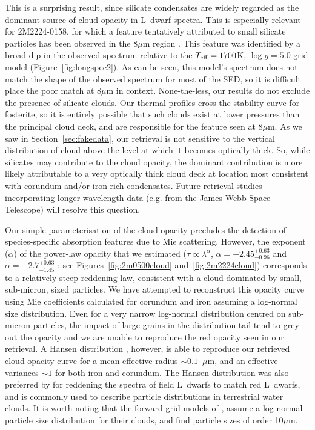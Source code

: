 \documentclass[useAMS,usenatbib]{mn2e}
\begin{document}
This is a surprising result, since silicate condensates are widely regarded as the dominant source of cloud opacity in L~dwarf spectra. 
This is especially relevant for 2M2224-0158, for which a feature tentatively attributed to small silicate particles has been observed in the 8$\mu$m region \citep{cushing2006}. This feature was identified by a broad dip in the observed spectrum relative to the $T_{\rm eff} = 1700$K, $\log g = 5.0$ grid model (Figure~\ref{fig:longspec2}).  As can be seen, this model's spectrum does not match the shape of the observed spectrum for most of the SED, so it is difficult place the poor match at 8$\mu$m in context.  None-the-less, our results do not exclude the presence of silicate clouds. Our thermal profiles cross the stability curve for fosterite, so it is entirely possible that such clouds exist at lower pressures than the principal cloud deck, and are responsible for the feature seen at 8$\mu$m. 
As we saw in Section~\ref{sec:fakedata}, our retrieval is not sensitive to the vertical distribution of cloud above the level at which it becomes optically thick. So, while silicates may contribute to the cloud opacity, the dominant contribution is more likely attributable to a very optically thick cloud deck at location most consistent with corundum and/or iron rich condensates.  Future retrieval studies incorporating longer wavelength data (e.g. from the James-Webb Space Telescope) will resolve this question. 


Our simple parameterisation of the cloud opacity precludes the detection of species-specific absorption features due to Mie scattering. However, the exponent ($\alpha$) of the power-law opacity that we estimated ($\tau \propto \lambda^\alpha$, $\alpha = -2.45^{+0.63}_{-0.96}$ and $\alpha = -2.7^{+0.63}_{-1.45}$ ; see Figures~\ref{fig:2m0500cloud} and~\ref{fig:2m2224cloud}) corresponds to a relatively steep reddening law, consistent with a cloud dominated by small, sub-micron, sized particles. We have attempted to reconstruct this opacity curve using Mie coefficients calculated for corundum and iron assuming a log-normal size distribution.  Even for a very narrow log-normal distribution centred on sub-micron particles, the impact of large grains in the distribution tail tend to grey-out the opacity and we are unable to reproduce the red opacity seen in our retrieval. A Hansen distribution \citep{hansen1971}, however, is able to reproduce our retrieved cloud opacity curve for a mean effective radius $\sim 0.1$~$\mu$m, and an effective variances $\sim 1$ for both iron and corundum.  The Hansen distribution was also preferred by \citet{hiranaka2016} for reddening the spectra of field L~dwarfs to match red L~dwarfs, and is commonly used to describe particle distributions in terrestrial water clouds.  It is worth noting that the forward grid models of \citet{sm08}, assume a log-normal particle size distribution for their clouds, and find particle sizes of order 10$\mu$m. 
\end{document}
